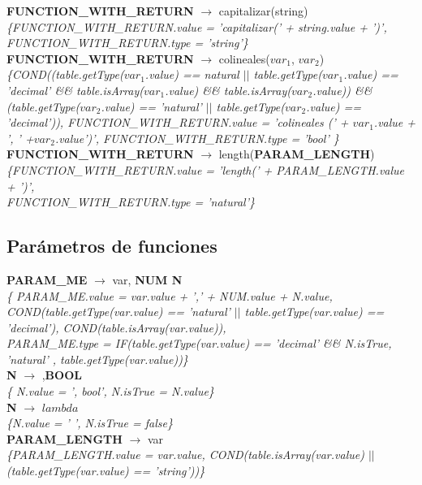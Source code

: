 \documentclass[10pt,a4paper]{article}
\begin{document}
\textbf{FUNCTION\_WITH\_RETURN} $\rightarrow$ capitalizar(string)   \\
\textit{\{FUNCTION\_WITH\_RETURN.value =  'capitalizar(' + string.value + ')', FUNCTION\_WITH\_RETURN.type = 'string'\}} \\

\textbf{FUNCTION\_WITH\_RETURN} $\rightarrow$ colineales($var_{1}$, $var_{2}$)   \\
\textit{\{COND((table.getType($var_{1}$.value) == natural $||$ table.getType($var_{1}$.value) == 'decimal' \&\& table.isArray($var_{1}$.value) \&\& table.isArray($var_{2}$.value)) \&\&
(table.getType($var_{2}$.value) == 'natural' $||$ table.getType($var_{2}$.value) == 'decimal')), FUNCTION\_WITH\_RETURN.value = 'colineales (' + $var_{1}$.value + ', ' +$var_{2}$.value')', FUNCTION\_WITH\_RETURN.type = 'bool' \}} \\

\textbf{FUNCTION\_WITH\_RETURN} $\rightarrow$ length(\textbf{PARAM\_LENGTH}) \\
\textit{\{FUNCTION\_WITH\_RETURN.value =  'length(' + PARAM\_LENGTH.value + ')',\\ 
FUNCTION\_WITH\_RETURN.type = 'natural'\}} \\

\subsection{Parámetros de funciones}
\textbf{PARAM\_ME} $\rightarrow$ var, \textbf{NUM N} \\
\textit{\{ PARAM\_ME.value = var.value + ',' + NUM.value + N.value, COND(table.getType(var.value) == 'natural' $||$ table.getType(var.value) == 'decimal'), COND(table.isArray(var.value)),\\
PARAM\_ME.type = IF(table.getType(var.value) == 'decimal' \&\& N.isTrue,  'natural' , table.getType(var.value))\}} \\

\textbf{N} $\rightarrow$ ,\textbf{BOOL} \\
\textit{\{ N.value = ', bool', N.isTrue = N.value\}} \\ 

\textbf{N} $\rightarrow$ $lambda$  \\
\textit{\{N.value = ' ', N.isTrue = false\}} \\

\textbf{PARAM\_LENGTH} $\rightarrow$ var \\
\textit{\{PARAM\_LENGTH.value = var.value, COND(table.isArray(var.value) $||$ (table.getType(var.value) == 'string'))\}} \\
\end{document}
